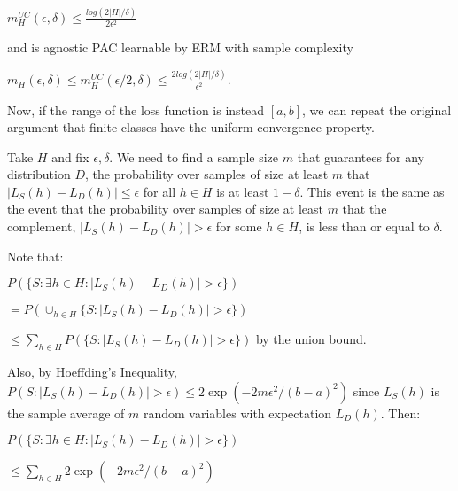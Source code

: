 \documentclass[12pt, letterpaper]{article}
\begin{document}
\vspace{5mm}

\hspace{50mm}$m_H^{UC}(\epsilon, \delta)\leq
    \frac{log(2|H|/\delta)}{2\epsilon ^2}$
    
\vspace{5mm}
and is agnostic PAC learnable by ERM with sample complexity

\vspace{5mm}

\hspace{50mm}$m_H(\epsilon, \delta) \leq 
    m_H^{UC}(\epsilon/2, \delta)\leq
    \frac{2log(2|H|/\delta)}{\epsilon ^2}$.
    
\vspace{5mm}

Now, if the range of the loss function is instead $[a, b]$, we can repeat the original argument that finite classes have the uniform convergence property.

\vspace{5mm}
Take $H$ and fix $\epsilon, \delta$. We need to find a sample size $m$ that guarantees for any distribution $D$, the probability over samples of size at least $m$ that $| L_S(h) - L_D(h)| \leq \epsilon$ for all $h\in H$ is at least $1-\delta$. 
This event is the same as the event that the probability over samples of size at least $m$ that the complement, $|L_S(h) - L_D(h)| > \epsilon$ for some $h\in H$, is less than or equal to $\delta$.

\vspace{5mm}
Note that:

\vspace{5mm}
$P(\{S: \exists h\in H: |L_S(h) - L_D(h)| > \epsilon\})$

\hspace{50mm}
$= P(\cup_{h\in H} \{S: |L_S(h) - L_D(h)| > \epsilon\})$

\hspace{50mm}
$\leq \sum_{h \in H}P(\{S: |L_S(h) - L_D(h)| > \epsilon\})$ by the union bound.

\vspace{5mm}
Also, by Hoeffding's Inequality, $P(S:|L_S(h) - L_D(h)| > \epsilon)\leq 2 \exp{(-2m\epsilon^2 / (b-a)^2)}$ since $L_S(h)$ is the sample average of $m$ random variables with expectation $L_D(h)$.
Then:

\vspace{5mm}
$P(\{S: \exists h\in H: |L_S(h) - L_D(h)| > \epsilon\})$

\hspace{50mm}
$\leq \sum_{h \in H}2 \exp{(-2m\epsilon^2 / (b-a)^2)}$
\end{document}

